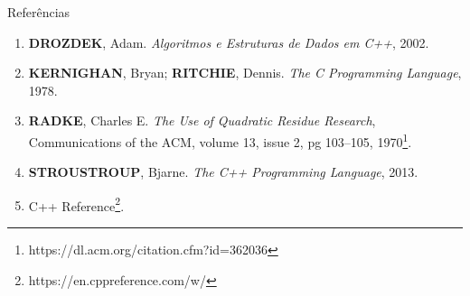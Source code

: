 \begin{frame}[fragile]{Referências}

    \begin{enumerate}
        \item \textbf{DROZDEK}, Adam. \textit{Algoritmos e Estruturas de Dados em C++}, 2002.

        \item \textbf{KERNIGHAN}, Bryan; \textbf{RITCHIE}, Dennis. \textit{The C Programming Language}, 1978.

        \item \textbf{RADKE}, Charles E. \textit{The Use of Quadratic Residue Research},
            Communications of the ACM, volume 13, issue 2, pg 103--105, 1970\footnote{https://dl.acm.org/citation.cfm?id=362036}.

        \item \textbf{STROUSTROUP}, Bjarne. \textit{The C++ Programming Language}, 2013.

		\item C++ Reference\footnote{https://en.cppreference.com/w/}.
    \end{enumerate}

\end{frame}
